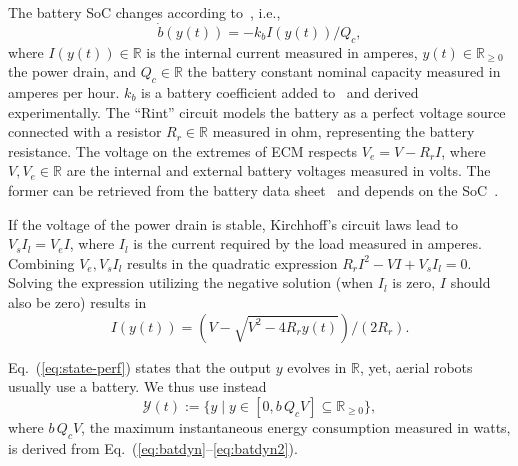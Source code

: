 \documentclass[letterpaper,10pt,journal,twoside]{IEEEtran}
\theoremstyle{definition}
\newtheorem{lem}[thm]{Lemma}
\newtheorem{defn}{Definition}[section]
\begin{document}
The battery SoC changes according to~\cite{hasan2018exogenous%
}, i.e.,
\begin{equation}\label{eq:batdyn}
  \dot{b}(y(t))=-k_bI(y(t))/Q_c,
\end{equation}
where $I(y(t))\in\mathbb{R}$ is the internal current measured in amperes, $y(t)\in\mathbb{R}_{\geq 0}$ the power drain, and $Q_c\in\mathbb{R}$ the battery constant nominal capacity measured in amperes per hour. $k_b$ is a battery coefficient added to~\cite{hasan2018exogenous%
} and derived experimentally. The ``Rint'' circuit models the battery as a perfect voltage source connected with a resistor $R_r\in\mathbb{R}$ measured in ohm, representing the battery resistance. The voltage on the extremes of ECM respects $V_e=V-R_rI$, where $V,V_e\in\mathbb{R}$ are the internal and external battery voltages measured in volts. The former can be retrieved from the battery data sheet~\cite{hinz2019comparison} and depends on the SoC~\cite{hasan2018exogenous}.

If the voltage of the power drain is stable, Kirchhoff's circuit laws lead to $V_sI_l=V_eI$, where $I_l$ is the current required by the load measured in amperes. Combining $V_e,V_sI_l$ results in the quadratic expression $R_rI^2-VI+V_sI_l=0$. Solving the expression utilizing the negative solution (when $I_l$ is zero, $I$ should also be zero) %
results in 
\begin{equation}\label{eq:batdyn2}
I(y(t))=(V-\sqrt{V^2-4R_ry(t)})/(2R_r).
\end{equation} 
%


Eq.~(\ref{eq:state-perf}) states that the output $y$ evolves in $\mathbb{R}$, %
yet, aerial robots usually use a battery.
We thus use instead
\begin{equation}\label{eq:output-const}
  \mathcal{Y}(t):=\{y\mid y\in[0,b\,Q_cV]\subseteq{\mathbb{R}_{\geq 0}}\},
\end{equation}
where $b\,Q_cV$, the maximum instantaneous energy consumption measured in watts, is derived from Eq.~(\ref{eq:batdyn}--\ref{eq:batdyn2}).
\end{document}
